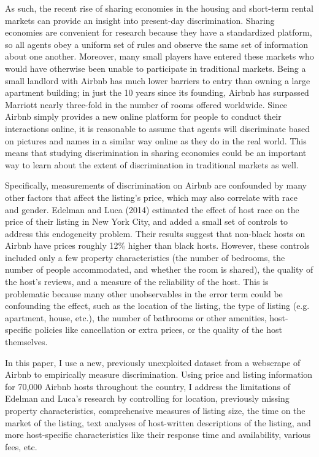 \documentclass[11pt, oneside]{article}
\begin{document}
As such, the recent rise of sharing economies in the housing and short-term rental markets can provide an insight into present-day discrimination. Sharing economies are convenient for research because they have a standardized platform, so all agents obey a uniform set of rules and observe the same set of information about one another. Moreover, many small players have entered these markets who would have otherwise been unable to participate in traditional markets. Being a small landlord with Airbnb has much lower barriers to entry than owning a large apartment building; in just the 10 years since its founding, Airbnb has surpassed Marriott nearly three-fold in the number of rooms offered worldwide.\cite{sharing} Since Airbnb simply provides a new online platform for people to conduct their interactions online, it is reasonable to assume that agents will discriminate based on pictures and names in a similar way online as they do in the real world. This means that studying discrimination in sharing economies could be an important way to learn about the extent of discrimination in traditional markets as well. 

Specifically, measurements of discrimination on Airbnb are confounded by many other factors that affect the listing's price, which may also correlate with race and gender. Edelman and Luca (2014) estimated the effect of host race on the price of their listing in New York City, and added a small set of controls to address this endogeneity problem. Their results suggest that non-black hosts on Airbnb have prices roughly 12\% higher than black hosts. However, these controls included only a few property characteristics (the number of bedrooms, the number of people accommodated, and whether the room is shared), the quality of the host's reviews, and a measure of the reliability of the host. This is problematic because many other unobservables in the error term could be confounding the effect, such as the location of the listing, the type of listing (e.g. apartment, house, etc.), the number of bathrooms or other amenities, host-specific policies like cancellation or extra prices, or the quality of the host themselves. 

In this paper, I use a new, previously unexploited dataset from a webscrape of Airbnb to empirically measure discrimination. Using price and listing information for 70,000 Airbnb hosts throughout the country, I address the limitations of Edelman and Luca's research by controlling for location, previously missing property characteristics, comprehensive measures of listing size, the time on the market of the listing, text analyses of host-written descriptions of the listing, and more host-specific characteristics like their response time and availability, various fees, etc. 
\end{document}

